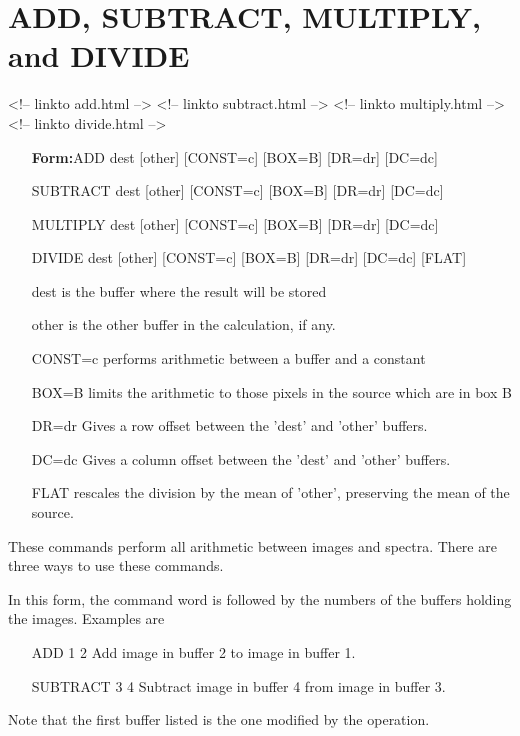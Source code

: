 \section{ADD, SUBTRACT, MULTIPLY, and DIVIDE}
\begin{rawhtml}
<!-- linkto add.html -->
<!-- linkto subtract.html -->
<!-- linkto multiply.html -->
<!-- linkto divide.html -->
\end{rawhtml}
\begin{itemize}
  \item[\textbf{Form:}ADD        dest {[other]} {[CONST=c]} {[BOX=B]} {[DR=dr]} {[DC=dc]}\hfill]{}
  \item[SUBTRACT   dest {[other]} {[CONST=c]} {[BOX=B]} {[DR=dr]} {[DC=dc]}\hfill]{}
  \item[MULTIPLY   dest {[other]} {[CONST=c]} {[BOX=B]} {[DR=dr]} {[DC=dc]}\hfill]{}
  \item[DIVIDE     dest {[other]} {[CONST=c]} {[BOX=B]} {[DR=dr]} {[DC=dc]} {[FLAT]}\hfill]{}
  \item[dest]{is the buffer where the result will be stored}
  \item[other]{is the other buffer in the calculation, if any.}
  \item[CONST=c]{performs arithmetic between a buffer and a constant}
  \item[BOX=B]{limits the arithmetic to those pixels
in the source which are in box B}
  \item[DR=dr]{Gives a row offset between the 'dest' and 'other' buffers.}
  \item[DC=dc]{Gives a column offset between the 'dest' and 'other' buffers.}
  \item[FLAT]{rescales the division by the mean of 'other', preserving the 
mean of the source.}
\end{itemize}
These commands perform all arithmetic between images and spectra.  There
are three ways to use these commands.


In this form, the command word is followed by the numbers of the buffers
holding the images.  Examples are
\begin{itemize}
  \item[ADD 1 2\hfill]{Add image in buffer 2 to image in buffer 1.}
  \item[SUBTRACT 3 4\hfill]{Subtract image in buffer 4 from image in buffer 3.}
\end{itemize}
Note that the first buffer listed is the one modified by the operation.

